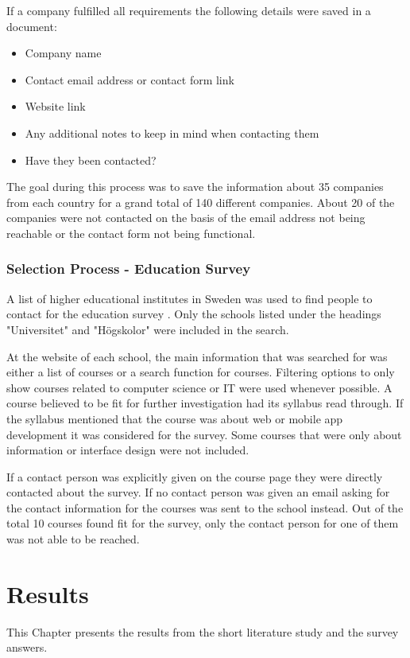 \documentclass[a4paper,12pt]{article}
\begin{document}
If a company fulfilled all requirements the following details were saved in a document:

\begin{itemize}
    \item Company name
    \item Contact email address or contact form link
    \item Website link
    \item Any additional notes to keep in mind when contacting them
    \item Have they been contacted?
\end{itemize}

The goal during this process was to save the information about 35 companies from each country for a grand total of 140 different companies. About 20 of the companies were not contacted on the basis of the email address not being reachable or the contact form not being functional.

\subsubsection{Selection Process - Education Survey}
\label{Project_participantSelection_processEdu}
A list of higher educational institutes in Sweden was used to find people to contact for the education survey \cite{higher_edu_sweden}. Only the schools listed under the headings "Universitet" and "Högskolor" were included in the search.

At the website of each school, the main information that was searched for was either a list of courses or a search function for courses. Filtering options to only show courses related to computer science or IT were used whenever possible. A course believed to be fit for further investigation had its syllabus read through. If the syllabus mentioned that the course was about web or mobile app development it was considered for the survey. Some courses that were only about information or interface design were not included.

If a contact person was explicitly given on the course page they were directly contacted about the survey. If no contact person was given an email asking for the contact information for the courses was sent to the school instead. Out of the total 10 courses found fit for the survey, only the contact person for one of them was not able to be reached.


\newpage
\section{Results}
\label{Results}
This Chapter presents the results from the short literature study and the survey answers.
\end{document}
